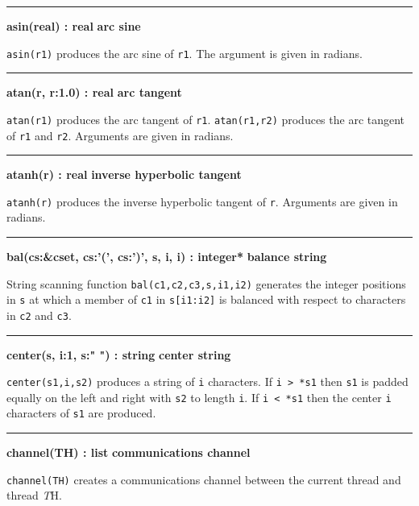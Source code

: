 \bigskip
\hrule\vspace{0.1cm}
\noindent
{\bf asin(real) : real } \hfill {\bf arc sine}

\noindent
{}\texttt{asin(r1)} produces the arc sine of \texttt{r1}.
The argument is given in radians.

\bigskip
\hrule\vspace{0.1cm}
\noindent
{\bf atan(r, r:1.0) : real } \hfill {\bf arc tangent}

\noindent
{}\texttt{atan(r1)} produces the arc tangent of
\texttt{r1}. \texttt{atan(r1,r2)} produces the arc tangent of
\texttt{r1} and \texttt{r2}. Arguments are given in radians.

\bigskip
\hrule\vspace{0.1cm}
\noindent
{\bf atanh(r) : real } \hfill {\bf inverse hyperbolic tangent}

\noindent
{}\texttt{atanh(r)} produces the inverse
hyperbolic tangent of \texttt{r}. Arguments are given in radians.

\bigskip
\hrule\vspace{0.1cm}
\noindent
{\bf bal(cs:\&cset, cs:'(', cs:')', s, i, i) : integer* } \hfill {\bf balance string}

\noindent
{}String scanning function
\texttt{bal(c1,c2,c3,s,i1,i2)} generates the integer positions in
\texttt{s} at which a member of \texttt{c1} in \texttt{s[i1:i2]} is
balanced with respect to characters in \texttt{c2} and \texttt{c3}.

\bigskip
\hrule\vspace{0.1cm}
\noindent
{\bf center(s, i:1, s:" ") : string } \hfill {\bf center string}

\noindent
{}\texttt{center(s1,i,s2)} produces a
string of \texttt{i} characters. If \texttt{i {\textgreater} *s1} then
\texttt{s1} is padded equally on the left and right with \texttt{s2} to
length \texttt{i}. If \texttt{i {\textless} *s1} then the center
\texttt{i} characters of \texttt{s1} are produced.

\bigskip
\hrule\vspace{0.1cm}
\noindent
{\bf channel(TH) : list } \hfill {\bf communications channel}

\noindent
{}\texttt{channel(TH)} creates a communications channel
between the current thread and thread {\textit TH}.

